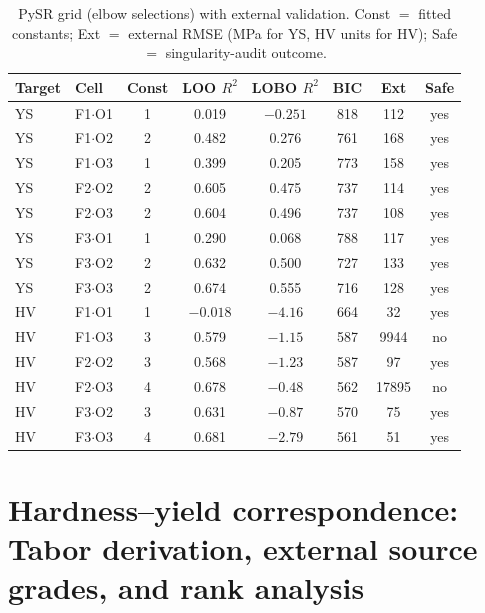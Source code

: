\documentclass[11pt]{article}
\begin{document}
\begin{table}[htb]
\centering
\caption{PySR grid (elbow selections) with external validation. Const $=$ fitted constants; Ext $=$ external RMSE (MPa for YS, HV units for HV); Safe $=$ singularity-audit outcome.}
\label{tab:pysr_grid}
\small
\begin{tabular}{llcccccc}
\toprule
Target & Cell & Const & LOO $R^2$ & LOBO $R^2$ & BIC & Ext & Safe \\
\midrule
YS & F1$\cdot$O1 & 1 & 0.019 & $-0.251$ & 818 & 112 & yes \\
YS & F1$\cdot$O2 & 2 & 0.482 & 0.276 & 761 & 168 & yes \\
YS & F1$\cdot$O3 & 1 & 0.399 & 0.205 & 773 & 158 & yes \\
YS & F2$\cdot$O2 & 2 & 0.605 & 0.475 & 737 & 114 & yes \\
YS & F2$\cdot$O3 & 2 & 0.604 & 0.496 & 737 & 108 & yes \\
YS & F3$\cdot$O1 & 1 & 0.290 & 0.068 & 788 & 117 & yes \\
YS & F3$\cdot$O2 & 2 & 0.632 & 0.500 & 727 & 133 & yes \\
YS & F3$\cdot$O3 & 2 & 0.674 & 0.555 & 716 & 128 & yes \\
\midrule
HV & F1$\cdot$O1 & 1 & $-0.018$ & $-4.16$ & 664 & 32 & yes \\
HV & F1$\cdot$O3 & 3 & 0.579 & $-1.15$ & 587 & 9944 & no \\
HV & F2$\cdot$O2 & 3 & 0.568 & $-1.23$ & 587 & 97 & yes \\
HV & F2$\cdot$O3 & 4 & 0.678 & $-0.48$ & 562 & 17895 & no \\
HV & F3$\cdot$O2 & 3 & 0.631 & $-0.87$ & 570 & 75 & yes \\
HV & F3$\cdot$O3 & 4 & 0.681 & $-2.79$ & 561 & 51 & yes \\
\bottomrule
\end{tabular}
\end{table}

\section{Hardness--yield correspondence: Tabor derivation, external source grades, and rank analysis}
\label{si:hardness}
\end{document}
